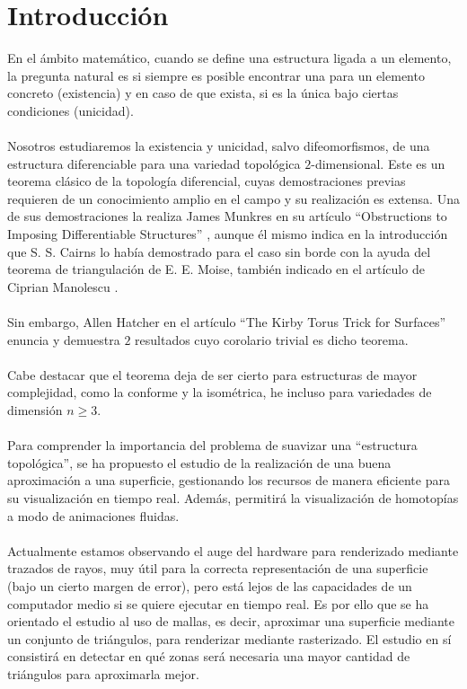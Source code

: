 %


\chapter{Introducción}

En el ámbito matemático, cuando se define una estructura ligada a un elemento, la pregunta natural es si siempre es posible encontrar una para un elemento concreto (existencia) y en caso de que exista, si es la única bajo ciertas condiciones (unicidad).\\
\\Nosotros estudiaremos la existencia y unicidad, salvo difeomorfismos, de una estructura diferenciable para una variedad topológica $2$-dimensional. Este es un teorema clásico de la topología diferencial, cuyas demostraciones previas requieren de un conocimiento amplio en el campo y su realización es extensa. Una de sus demostraciones la realiza James Munkres en su artículo ``Obstructions to Imposing Differentiable Structures'' \cite{Munkres}, aunque él mismo indica en la introducción que S. S. Cairns lo había demostrado para el caso sin borde con la ayuda del teorema de triangulación de E. E. Moise, también indicado en el artículo de Ciprian Manolescu \cite{Historical}.\\
\\Sin embargo, Allen Hatcher en el artículo ``The Kirby Torus Trick for Surfaces'' \cite{arXiv:1312.3518} enuncia y demuestra $2$ resultados cuyo corolario trivial es dicho teorema.\\
\\Cabe destacar que el teorema deja de ser cierto para estructuras de mayor complejidad, como la conforme y la isométrica, he incluso para variedades de dimensión $n \geq 3$.\\
\\Para comprender la importancia del problema de suavizar una ``estructura topológica'', se ha propuesto el estudio de la realización de una buena aproximación a una superficie, gestionando los recursos de manera eficiente para su visualización en tiempo real. Además, permitirá la visualización de homotopías a modo de animaciones fluidas.\\
\\Actualmente estamos observando el auge del hardware para renderizado mediante trazados de rayos, muy útil para la correcta representación de una superficie (bajo un cierto margen de error), pero está lejos de las capacidades de un computador medio si se quiere ejecutar en tiempo real. Es por ello que se ha orientado el estudio al uso de mallas, es decir, aproximar una superficie mediante un conjunto de triángulos, para renderizar mediante rasterizado. El estudio en sí consistirá en detectar en qué zonas será necesaria una mayor cantidad de triángulos para aproximarla mejor.\\
